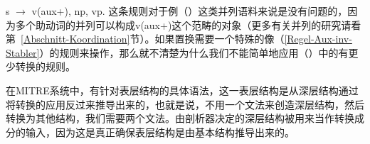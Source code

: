 \ea
s $\to$ v(aux+), np, vp.
\z
这条规则对于例（）这类并列语料来说是没有问题的，因为多个助动词的并列可以构成v(aux+)这个范畴的对象（更多有关并列的研究请看第~\ref{Abschnitt-Koordination}节）。如果置换需要一个特殊的像（\ref{Regel-Aux-inv-Stabler}）的规则来操作，那么就不清楚为什么我们不能简单地应用（）中的有更少转换的规则。

\addlines
在MITRE系统\citep{ZFHW65a}中，有针对表层结构的具体语法，这一表层结构是从深层结构通过将转换的应用反过来推导出来的，也就是说，不用一个文法来创造深层结构，然后转换为其他结构，我们需要两个文法。由剖析器决定的深层结构被用来当作转换成分的输入，因为这是真正确保表层结构是由基本结构推导出来的\citep[]{Kay2011a}。

